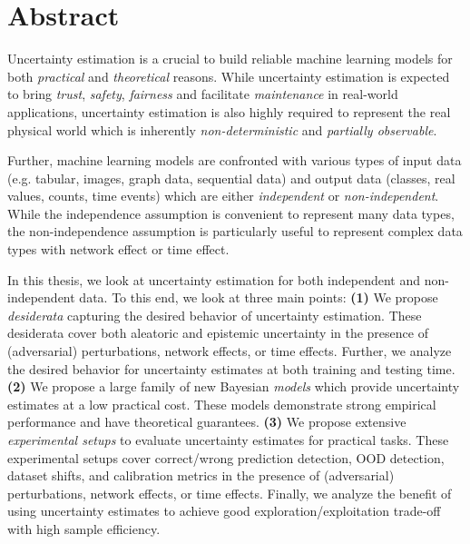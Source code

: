 \chapter*{Abstract}
%

Uncertainty estimation is a crucial to build reliable machine learning models for both \emph{practical} and \emph{theoretical} reasons. While uncertainty estimation is expected to bring \emph{trust}, \emph{safety}, \emph{fairness} and facilitate \emph{maintenance} in real-world applications, uncertainty estimation is also highly required to represent the real physical world which is inherently \emph{non-deterministic} and \emph{partially observable}. 

Further, machine learning models are confronted with various types of input data (e.g. tabular, images, graph data, sequential data) and output data (classes, real values, counts, time events) which are either \emph{independent} or \emph{non-independent}. While the independence assumption is convenient to represent many data types, the non-independence assumption is particularly useful to represent complex data types with network effect or time effect.

In this thesis, we look at uncertainty estimation for both independent and non-independent data. To this end, we look at three main points: \textbf{(1)} We propose \emph{desiderata} capturing the desired behavior of uncertainty estimation. These desiderata cover both aleatoric and epistemic uncertainty in the presence of (adversarial) perturbations, network effects, or time effects. Further, we analyze  the desired behavior for uncertainty estimates at both training and testing time. \textbf{(2)} We propose a large family of new Bayesian \emph{models} which provide uncertainty estimates at a low practical cost. These models demonstrate strong empirical performance and have theoretical guarantees. \textbf{(3)} We propose extensive \emph{experimental setups} to evaluate uncertainty estimates for practical tasks. These experimental setups cover correct/wrong prediction detection, OOD detection, dataset shifts, and calibration metrics in the presence of (adversarial) perturbations, network effects, or time effects. Finally, we analyze the benefit of using uncertainty estimates to achieve good exploration/exploitation trade-off with high sample efficiency.
\\

